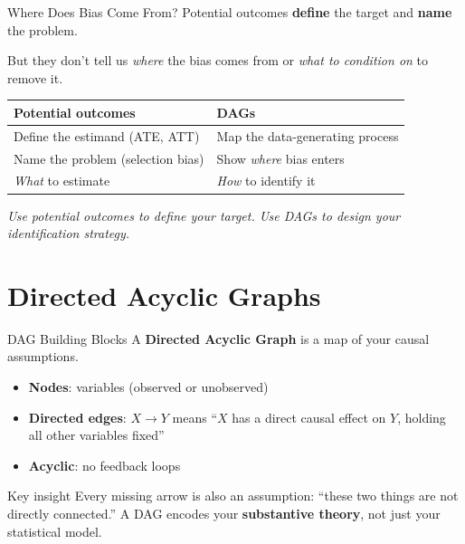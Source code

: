 \begin{frame}{Where Does Bias Come From?}
  Potential outcomes \textbf{define} the target and \textbf{name} the problem.

  \vspace{8pt}

  But they don't tell us \textit{where} the bias comes from or \textit{what to condition on} to remove it.

  \vspace{10pt}

  \begin{tabular}{@{}ll@{}}
    \toprule
    \textbf{Potential outcomes} & \textbf{DAGs} \\
    \midrule
    Define the estimand (ATE, ATT) & Map the data-generating process \\
    Name the problem (selection bias) & Show \textit{where} bias enters \\
    \textit{What} to estimate & \textit{How} to identify it \\
    \bottomrule
  \end{tabular}

  \vspace{12pt}

  \textit{Use potential outcomes to define your target. Use DAGs to design your identification strategy.}
\end{frame}


\section{Directed Acyclic Graphs}

\begin{frame}{DAG Building Blocks}
  A \textbf{Directed Acyclic Graph} is a map of your causal assumptions.

  \vspace{10pt}

  \begin{itemize}
    \item \textbf{Nodes}: variables (observed or unobserved)
    \item \textbf{Directed edges}: $X \to Y$ means ``$X$ has a direct causal effect on $Y$,
          holding all other variables fixed''
    \item \textbf{Acyclic}: no feedback loops
  \end{itemize}

  \vspace{10pt}

  \begin{block}{Key insight}
    Every missing arrow is also an assumption: ``these two things are not directly connected.''
    A DAG encodes your \textbf{substantive theory}, not just your statistical model.
  \end{block}
\end{frame}

